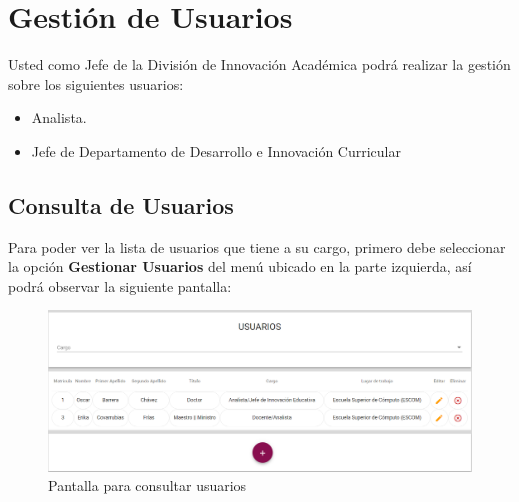 \clearpage
\section{Gestión de Usuarios}

    Usted como Jefe de la División de  Innovación Académica podrá realizar la gestión sobre los siguientes usuarios:
    \begin{itemize}
        \item Analista.
        \item Jefe de Departamento de Desarrollo e Innovación Curricular
    \end{itemize}


    \subsection{Consulta de Usuarios}
  Para poder ver la lista de usuarios que tiene a su cargo, primero debe seleccionar la opción \textbf{Gestionar Usuarios} del menú ubicado en la parte izquierda, así podrá observar la siguiente pantalla:

  \begin{figure}[H]
  	\centering
  	\hypertarget{consultarUs}{\includegraphics[width=0.6\linewidth]{images/SP5/Consultar-Usuario}}
  	\caption{Pantalla para consultar usuarios}
  	\label{consultarrh}
  \end{figure}


